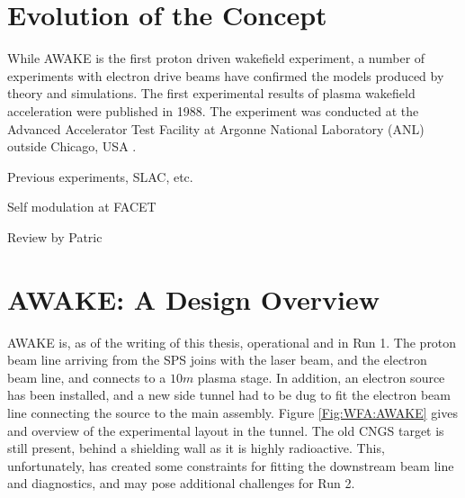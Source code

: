 \section{Evolution of the Concept}
\label{WFA:History}

While AWAKE is the first proton driven wakefield experiment, a number of experiments with electron drive beams have confirmed the models produced by theory and simulations. The first experimental results of plasma wakefield acceleration were published in 1988. The experiment was conducted at the Advanced Accelerator Test Facility at Argonne National Laboratory (ANL) outside Chicago, USA \cite{rosenzweig:1988}.




Previous experiments, SLAC, etc.

\cite{rosenzweig:1988, blumenfeld:2007, kallos:2008, litos:2014}

Self modulation at FACET \cite{adli:2016}

Review by Patric \cite{muggli:2009}

\section{AWAKE: A Design Overview}
\label{WFA:Design}

AWAKE is, as of the writing of this thesis, operational and in Run 1. The proton beam line arriving from the SPS joins with the laser beam, and the electron beam line, and connects to a $10\unit{m}$ plasma stage. In addition, an electron source has been installed, and a new side tunnel had to be dug to fit the electron beam line connecting the source to the main assembly. Figure \ref{Fig:WFA:AWAKE} gives and overview of the experimental layout in the tunnel. The old CNGS target is still present, behind a shielding wall as it is highly radioactive. This, unfortunately, has created some constraints for fitting the downstream beam line and diagnostics, and may pose additional challenges for Run 2.

